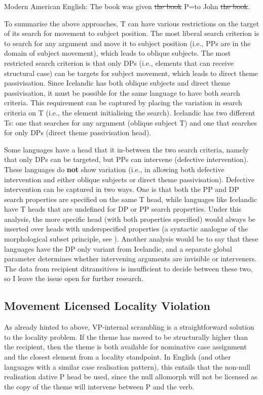 \begin{exe}
	\ex Modern American English: The book was given \sout{the book} P=to John \sout{the book}.\label{ex:amen-thepass}
\end{exe}

To summarise the above approaches, T can have various restrictions on the target of its search for movement to subject position. The most liberal search criterion is to search for any argument and move it to subject position (i.e., PPs are in the domain of subject movement), which leads to oblique subjects. The most restricted search criterion is that only DPs (i.e., elements that can receive structural case) can be targets for subject movement, which leads to direct theme passivisation. Since Icelandic has both oblique subjects and direct theme passivisation, it must be possible for the same language to have both search criteria. This requirement can be captured by placing the variation in search criteria on T (i.e., the element initialising the search). Icelandic has two different Ts: one that searches for any argument (oblique subject T) and one that searches for only DPs (direct theme passivisation head).

Some languages have a head that it in-between the two search criteria, namely that only DPs can be targeted, but PPs can intervene (defective intervention). These languages do \textbf{not} show variation (i.e., in allowing both defective intervention and either oblique subjects or direct theme passivisation). Defective intervention can be captured in two ways. One is that both the PP and DP search properties are specified on the same T head, while languages like Icelandic have T heads that are undefined for DP or PP search properties. Under this analysis, the more specific head (with both properties specified) would always be inserted over heads with underspecified properties (a syntactic analogue of the morphological subset principle, see \citealt{Halle.1993}). Another analysis would be to say that these languages have the DP only variant from Icelandic, and a separate global parameter determines whether intervening arguments are invisible or interveners. The data from recipient ditransitives is insufficient to decide between these two, so I leave the issue open for further research.

\subsection{Movement Licensed Locality Violation}
As already hinted to above, VP-internal scrambling is a straightforward solution to the locality problem. If the theme has moved to be structurally higher than the recipient, then the theme is both available for nominative case assignment and the closest element from a locality standpoint. In English (and other languages with a similar case realisation pattern), this entails that the non-null realisation dative P head be used, since the null allomorph will not be licensed as the copy of the theme will intervene between P and the verb.


